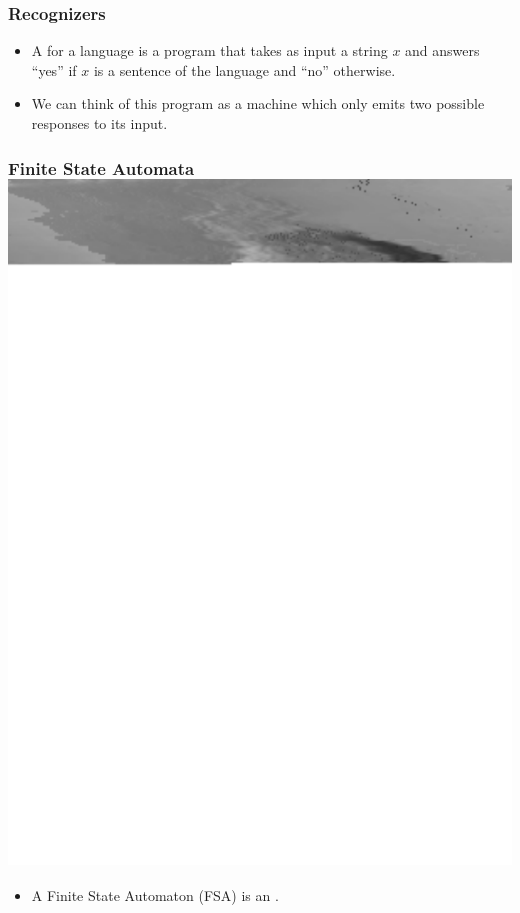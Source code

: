 \begin{frame}[fragile]
  \frametitle{Recognizers}

  \begin{itemize}
  \item A  for a language is a program that takes as input a
string $x$ and answers ``yes'' if $x$ is a sentence of the language and
``no'' otherwise.
\item We can think of this program as a machine which only emits two possible
responses to its input.
  \end{itemize}



\end{frame}
\begin{frame}[fragile]
 \frametitle{Finite State Automata\hfill \includegraphics[scale=.15]{../images/skleene}}

\begin{itemize}
\item A Finite State Automaton (FSA) is an .


\end{itemize}
\end{frame}
